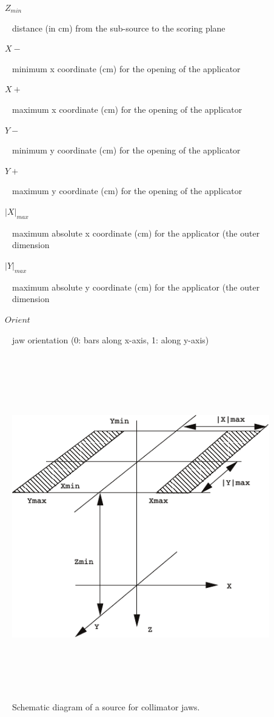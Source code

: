 \documentclass[12pt,twoside]{article}
\begin{document}
\begin{description}
\item [~~~~$Z_{min}$] distance (in cm) from the sub-source to the scoring plane
\item [~~~~$X-$] minimum x coordinate (cm) for the opening of the applicator
\item [~~~~$X+$] maximum x coordinate (cm) for the opening of the applicator
\item [~~~~$Y-$] minimum y coordinate (cm) for the opening of the applicator
\item [~~~~$Y+$] maximum y coordinate (cm) for the opening of the applicator
\item [~~~~$|X|_{max}$] maximum absolute x coordinate (cm) for the applicator (the outer dimension
\item [~~~~$|Y|_{max}$] maximum absolute y coordinate (cm) for the applicator (the outer dimension
\item [~~~~$Orient$] jaw orientation (0: bars along x-axis, 1: along y-axis)
\end{description}
\begin{figure}[htbp]
\begin{center}
\leavevmode
\mbox{}\hspace{0cm}
\includegraphics[height=15cm]{figures/source2}
\caption[]
{Schematic diagram of a source for collimator jaws. }
\label{source2}
\end{center}
\end{figure}
\end{document}
